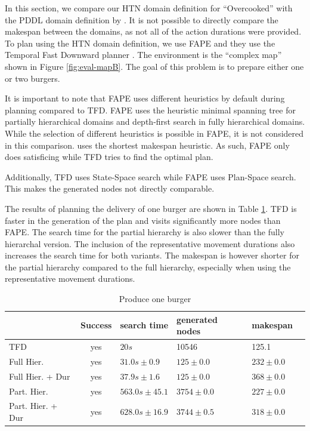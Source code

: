 In this section, we compare our HTN domain definition for ``Overcooked'' with the PDDL domain definition by \cite{yuxinliuPlanningOvercookedGame2020}.
It is not possible to directly compare the makespan between the domains, as not all of the action durations were provided.
To plan using the HTN domain definition, we use FAPE \citep{bit-monnotTemporalHierarchicalModels2016a} and they use the Temporal Fast Downward planner \citep{eyerichUsingContextenhancedAdditive2009}.
The environment is the ``complex map'' shown in Figure \ref{fig:eval-mapB}.
The goal of this problem is to prepare either one or two burgers.


It is important to note that FAPE uses different heuristics by default during planning compared to TFD.
FAPE uses the heuristic minimal spanning tree for partially hierarchical domains and depth-first search in fully hierarchical domains.
While the selection of different heuristics is possible in FAPE, it is not considered in this comparison.
\cite{yuxinliuPlanningOvercookedGame2020} uses the shortest makespan heuristic.
As such, FAPE only does satisficing while TFD tries to find the optimal plan.

Additionally, TFD uses State-Space search while FAPE uses Plan-Space search.
This makes the generated nodes not directly comparable.

The results of planning the delivery of one burger are shown in Table \ref{tab:eval-burger}.
TFD is faster in the generation of the plan and visits significantly more nodes than FAPE.
The search time for the partial hierarchy is also slower than the fully hierarchal version.
The inclusion of the representative movement durations also increases the search time for both variants.
The makespan is however shorter for the partial hierarchy compared to the full hierarchy, especially when using the representative movement durations.


\begin{table}
  \centering
  \begin{tabular}{lcllll}
                   & Success & search time  & generated nodes & makespan         \\
    \hline
    TFD             & yes & $20s$            &  10546          &  125.1       \\
    Full Hier.            & yes & $31.0s\pm 0.9$   & $125\pm 0.0$    &  $232\pm 0.0$            \\
    Full Hier. + Dur      & yes & $37.9s\pm 1.6$   & $125\pm 0.0$    &  $368\pm 0.0$      \\
    Part. Hier.      & yes & $563.0s\pm 45.1$ & $3754\pm 0.0$   &  $227\pm 0.0$   \\
    Part. Hier. + Dur & yes & $628.0s\pm 16.9$ & $3744\pm 0.5$   &  $318\pm 0.0$            \\
  \end{tabular}
  \caption{Produce one burger}
  \label{tab:eval-burger}
\end{table}

